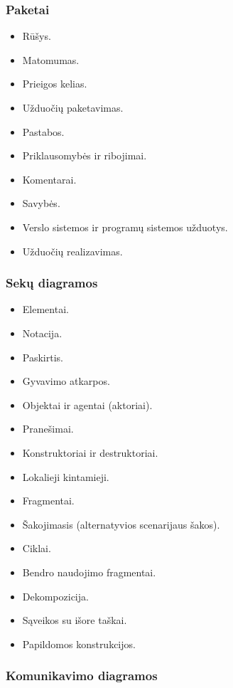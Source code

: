 \subsubsection{Paketai}

\begin{itemize}
  \item Rūšys.
  \item Matomumas.
  \item Prieigos kelias.
  \item Užduočių paketavimas.
  \item Pastabos.
  \item Priklausomybės ir ribojimai.
  \item Komentarai.
  \item Savybės.
  \item Verslo sistemos ir programų sistemos užduotys.
  \item Užduočių realizavimas.
\end{itemize}

\subsubsection{Sekų diagramos}

\begin{itemize}
  \item Elementai.
  \item Notacija.
  \item Paskirtis.
  \item Gyvavimo atkarpos.
  \item Objektai ir agentai (aktoriai).
  \item Pranešimai.
  \item Konstruktoriai ir destruktoriai.
  \item Lokalieji kintamieji.
  \item Fragmentai.
  \item Šakojimasis (alternatyvios scenarijaus šakos).
  \item Ciklai.
  \item Bendro naudojimo fragmentai.
  \item Dekompozicija.
  \item Sąveikos su išore taškai.
  \item Papildomos konstrukcijos.
\end{itemize}

\subsubsection{Komunikavimo diagramos}


